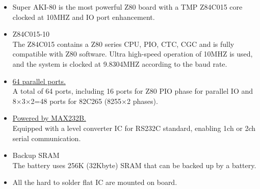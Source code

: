 \documentclass[letterpaper]{article}
\newcommand{\x}{$\times$}
\begin{document}
    {\large
    \begin{itemize}
        \item Super AKI-80 is the most powerful Z80 board with a TMP Z84C015 core clocked
        at 10MHZ and IO port enhancement.
        \item Z84C015-10\\
        The Z84C015 contains a Z80 series CPU, PIO, CTC, CGC and is fully compatible with Z80 software.
        Ultra high-speed operation of 10MHZ is used, and the system is clocked at 9.8304MHZ according to the
        baud rate.
        \item \underline{64 parallel ports.}\\
        A total of 64 ports, including 16 ports for Z80 PIO phase for parallel IO and 8\x 3\x 2=48 ports
        for 82C265 (8255\x 2 phases).
        \item \underline{Powered by MAX232B.}\\
        Equipped with a level converter IC for RS232C standard, enabling 1ch or 2ch serial communication.
        \item Backup SRAM\\
        The battery uses 256K (32Kbyte) SRAM that can be backed up by a battery.
        \item All the hard to solder flat IC are mounted on board.
    \end{itemize}

}
\end{document}
